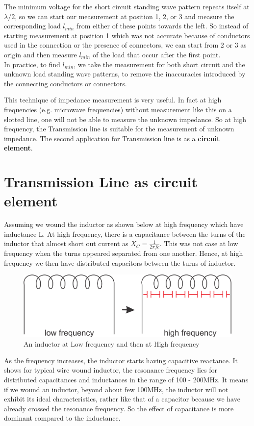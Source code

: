 The minimum voltage for the short circuit standing wave pattern repeats itself at $\lambda/2$, so we can start our measurement at position 1, 2, or 3 and measure the corresponding load $l_{min}$ from either of these points towards the left. So instead of starting measurement at position 1 which was not accurate because of conductors used in the connection or the presence of connectors, we can start from 2 or 3 as origin and  then measure $l_{min}$ of the load that occur after the first point.\\
In practice, to find $l_{min}$, we take the measurement for both short circuit and the unknown load standing
wave patterns, to remove the inaccuracies introduced by the connecting conductors or connectors.\newline

This technique of impedance measurement is very useful. In fact at high frequencies (e.g. microwave frequencies) without measurement like this on a slotted line, one will not be able to measure the unknown impedance. So at high frequency, the Transmission line is suitable for the measurement of unknown impedance.
The second application for Transmission line is as a \textbf{circuit element}.

\section{ Transmission Line as circuit element}
Assuming we wound the inductor as shown below at high frequency which have inductance L. At high frequency, there is a capacitance between the turns of the inductor that almost short out current as $X_{C} = \frac{1}{2\pi fc}$. This was not case at low frequency when the turns appeared separated from one another. Hence, at high frequency we then have distributed capacitors between the turns of inductor.
\begin{figure}[h]
\centering
\includegraphics[width=1\linewidth]{./graphics/group10diagram3}
\caption{An inductor at Low frequency and then at High frequency}
\end{figure}

As the frequency increases, the inductor starts having capacitive reactance. It shows for typical wire wound inductor, the resonance frequency lies for distributed capacitances and inductances in the range of 100 - 200MHz.
It means if we wound an inductor, beyond about few 100MHz, the inductor will not exhibit its ideal characteristics, rather like that of a capacitor because we have already crossed the resonance frequency. So the effect of capacitance is more dominant compared to the inductance.

